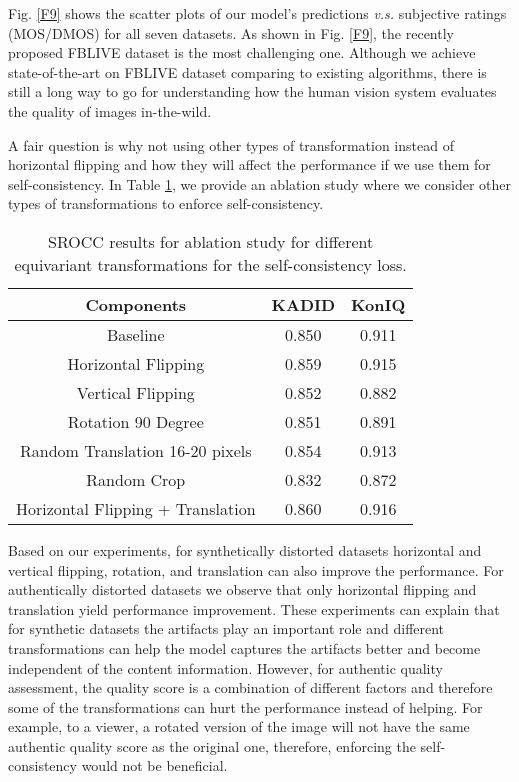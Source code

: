 \documentclass[10pt,twocolumn,letterpaper]{article}
\begin{document}
\clearpage
{\small


}

\clearpage

Fig. \ref{F9} shows the scatter plots of our model's predictions \textit{v.s.}  subjective ratings (MOS/DMOS) for all seven datasets. As shown in Fig. \ref{F9}, the recently proposed FBLIVE dataset is the most challenging one. Although we achieve state-of-the-art on FBLIVE dataset comparing to existing algorithms, there is still a long way to go for understanding how the human vision system evaluates the quality of images in-the-wild.


A fair question is why not using other types of transformation instead of horizontal flipping and how they will affect the performance if we use them for self-consistency.
In Table \ref{TB3s}, we provide an ablation study where we consider other types of transformations to enforce self-consistency.


\begin{table}[h]
\centering
\caption{SROCC results for ablation study for different equivariant transformations for the self-consistency loss.}
\resizebox{2.45 in}{!} {
\begin{tabular}{c|c|c}
\hline 
Components & KADID & KonIQ\tabularnewline
\hline 
Baseline & 0.850 & 0.911\tabularnewline
Horizontal Flipping & 0.859 & 0.915\tabularnewline
Vertical Flipping & 0.852 & 0.882\tabularnewline
Rotation 90 Degree & 0.851 & 0.891\tabularnewline
Random Translation 16-20 pixels & 0.854 & 0.913\tabularnewline
Random Crop & 0.832 & 0.872\tabularnewline
Horizontal Flipping + Translation & 0.860 & 0.916\tabularnewline
\hline 
\end{tabular}

}
\label{TB3s}
\end{table}


Based on our experiments, for synthetically distorted datasets horizontal and vertical flipping, rotation, and translation can also improve the performance.
For authentically distorted datasets we observe that only horizontal flipping and translation yield performance improvement. 
These experiments can explain that for synthetic datasets the artifacts play an important role and different transformations can help the model captures the artifacts better and become independent of the content information. However, for authentic quality assessment, the quality score is a combination of different factors and therefore some of the transformations can hurt the performance instead of helping. 
For example, to a viewer, a rotated version of the image will not have the same authentic quality score as the original one, therefore, enforcing the self-consistency would not be beneficial.
\end{document}
